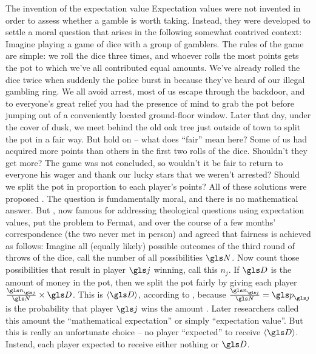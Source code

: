 \begin{history}{The invention of the expectation value}
Expectation values 
were not invented in order to assess whether a gamble is 
worth taking. Instead, they were developed to settle a  
moral question that arises in the following somewhat contrived 
context: Imagine playing a game of dice with a 
group of gamblers. The rules of the game are simple: we 
roll the dice three times,  and whoever rolls the most points 
gets the pot to which we've all contributed equal amounts. 
We've already rolled the dice twice when suddenly the 
police burst in because they've heard of our illegal gambling ring. 
We all avoid arrest, most of us escape through the backdoor, 
and to everyone's great relief you had the presence of mind 
to grab the pot before jumping out of a conveniently located 
ground-floor window. Later that day, under the cover of dusk, 
we meet behind the old oak tree just outside of town to split 
the pot in a fair way. But hold on -- what does ``fair'' mean here?
Some of us had acquired more points than others in the first 
two rolls of the dice. Shouldn't they get more? The game was 
not concluded, so wouldn't it be fair to return to everyone his 
wager and thank our lucky stars that we weren't arrested? 
Should we split the pot in proportion to each player's points? 
All of these solutions were proposed \cite{Devlin2008}.
The question is fundamentally moral, and there is no 
mathematical answer. But , now famous for 
addressing theological questions using expectation values, put the 
problem to Fermat, and over the course of a few months' 
correspondence (the two never met in person)  and 
 agreed that fairness is achieved as follows: 
Imagine all (equally likely) possible outcomes of the third round 
of throws of the dice, call the number of all possibilities $\N$. 
Now count those possibilities that result in player $\gj$ winning, 
call this $n_j$. If $\gD$ is the amount of money in the pot, then 
we split the pot fairly by giving each player
 $\frac{\gn_\gj}{\N}\times \gD$.
This is $\ave{\gD}$, according to , 
because $\frac{\gn_\gj}{\N}=\p_\gj$ is the probability that player $\gj$ wins the
amount \gD. 
Later researchers called this amount the ``mathematical expectation''  
or simply ``expectation value''. But this is really an unfortunate choice 
 -- no player ``expected'' to receive $\ave{\gD}$. 
Instead, each player expected to receive either nothing or $\gD$. 
\end{history}

